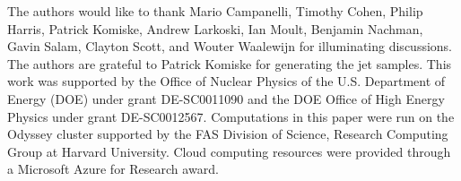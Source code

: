 \documentclass[aps,prl,floatfix,preprintnumbers,twocolumn,groupedaddress,nofootinbib,longbibliography]{revtex4-1}
\begin{document}
\begin{acknowledgments}
The authors would like to thank Mario Campanelli, Timothy Cohen, Philip Harris, Patrick Komiske, Andrew Larkoski, Ian Moult, Benjamin Nachman, Gavin Salam, Clayton Scott, and Wouter Waalewijn for illuminating discussions.
%
The authors are grateful to Patrick Komiske for generating the jet samples.
%
This work was supported by the Office of Nuclear Physics of the U.S. Department of Energy (DOE) under grant DE-SC0011090 and the DOE Office of High Energy Physics under grant DE-SC0012567.
%
Computations in this paper were run on the Odyssey cluster supported by the FAS Division of Science, Research Computing Group at Harvard University.
%
Cloud computing resources were provided through a Microsoft Azure for Research award.
\end{acknowledgments}



\end{document}
